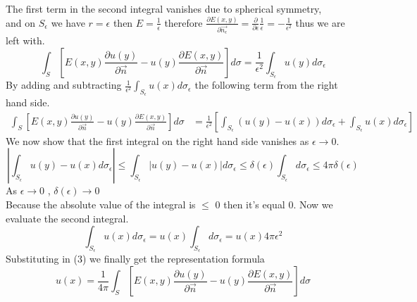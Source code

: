 The first term in the second integral vanishes due to spherical symmetry, 
\\and on $S_\epsilon$ we have $r=\epsilon$ then $E = \frac{1}{\epsilon}$ therefore $\displaystyle \frac{\partial E(x,y)}{\partial \vec{n_\epsilon}} = \frac{\partial}{\partial \epsilon}\frac{1}{\epsilon} = -\frac{1}{\epsilon^2}$
thus we are left with.
\[
    \int_S \left[E(x,y)\frac{\partial u(y)}{\partial \vec{n}}-u(y)\frac{\partial E(x,y)}{\partial \vec{n}}\right] d\sigma  = \frac{1}{\epsilon^2} \int_{S_\epsilon} u(y) d\sigma_\epsilon    
\]
By adding and subtracting $\displaystyle \frac{1}{\epsilon^2} \int_{S_\epsilon} u(x) d\sigma_\epsilon$ the following term from the right hand side.
\begin{align}
\int_S \left[E(x,y)\frac{\partial u(y)}{\partial \vec{n}}-u(y)\frac{\partial E(x,y)}{\partial \vec{n}}\right] d\sigma  &= \frac{1}{\epsilon^2} \left[\int_{S_\epsilon} (u(y) - u(x)) d\sigma_\epsilon + \int_{S_\epsilon} u(x) d\sigma_\epsilon\right]
\end{align}
We now show that the first integral on the right hand side vanishes as $\epsilon \to 0$.
\[
    \left|\int_{S_\epsilon} u(y)-u(x) d\sigma_\epsilon \right| \leq \int_{S_\epsilon} |u(y)-u(x)| d\sigma_\epsilon \leq \delta(\epsilon)\int_{S_\epsilon} d\sigma_\epsilon \leq 4\pi \delta(\epsilon)    
\]
As $\epsilon \to 0$ , $\delta(\epsilon) \to 0$
\\
Because the absolute value of the integral is $\leq$ 0 then it's equal 0. Now we evaluate the second integral.
\[
    \int_{S_\epsilon} u(x)d\sigma_\epsilon = u(x)\int_{S_\epsilon}d\sigma_\epsilon = u(x) 4\pi\epsilon^2
\]
Substituting in (3) we finally get the representation formula
\[
    u(x) = \frac{1}{4\pi} \int_S \left[E(x,y)\frac{\partial u(y)}{\partial \vec{n}}-u(y)\frac{\partial E(x,y)}{\partial \vec{n}}\right] d\sigma    
\]
\newpage
\setcounter{equation}{0}
